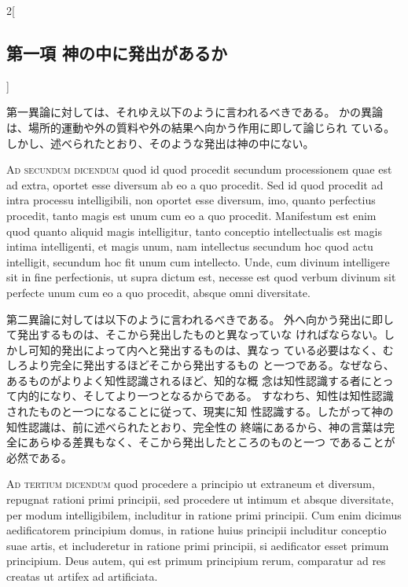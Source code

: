 \documentclass[paper=a4paper,fontsize=10pt,jafontsize=9pt,titlepage]{jlreq}
\begin{document}
\begin{paracol}{2}[\subsection{第一項 神の中に発出があるか}]
\switchcolumn


第一異論に対しては、それゆえ以下のように言われるべきである。
かの異論は、場所的運動や外の質料や外の結果へ向かう作用に即して論じられ
 ている。しかし、述べられたとおり、そのような発出は神の中にない。


\switchcolumn*[\subsection{ad.2}]


{\scshape Ad secundum dicendum} quod id quod procedit secundum processionem quae
est ad extra, oportet esse diversum ab eo a quo procedit. Sed id quod
procedit ad intra processu intelligibili, non oportet esse diversum,
imo, quanto perfectius procedit, tanto magis est unum cum eo a quo
procedit. Manifestum est enim quod quanto aliquid magis intelligitur,
tanto conceptio intellectualis est magis intima intelligenti, et magis
unum, nam intellectus secundum hoc quod actu intelligit, secundum hoc
fit unum cum intellecto. Unde, cum divinum intelligere sit in fine
perfectionis, ut supra dictum est, necesse est quod verbum divinum sit
perfecte unum cum eo a quo procedit, absque omni diversitate.


\switchcolumn


第二異論に対しては以下のように言われるべきである。
外へ向かう発出に即して発出するものは、そこから発出したものと異なっていな
 ければならない。しかし可知的発出によって内へと発出するものは、異なっ
 ている必要はなく、むしろより完全に発出するほどそこから発出するもの
 と一つである。なぜなら、あるものがよりよく知性認識されるほど、知的な概
 念は知性認識する者にとって内的になり、そしてより一つとなるからである。
 すなわち、知性は知性認識されたものと一つになることに従って、現実に知
 性認識する。したがって神の知性認識は、前に述べられたとおり、完全性の
 終端にあるから、神の言葉は完全にあらゆる差異もなく、そこから発出したところのものと一つ
 であることが必然である。


\switchcolumn*[\subsection{ad.3}]


{\scshape Ad tertium dicendum} quod procedere a principio ut extraneum et diversum,
repugnat rationi primi principii, sed procedere ut intimum et absque
diversitate, per modum intelligibilem, includitur in ratione primi
principii. Cum enim dicimus aedificatorem principium domus, in ratione
huius principii includitur conceptio suae artis, et includeretur in
ratione primi principii, si aedificator esset primum principium. Deus
autem, qui est primum principium rerum, comparatur ad res creatas ut
artifex ad artificiata.



\end{paracol}
\end{document}
